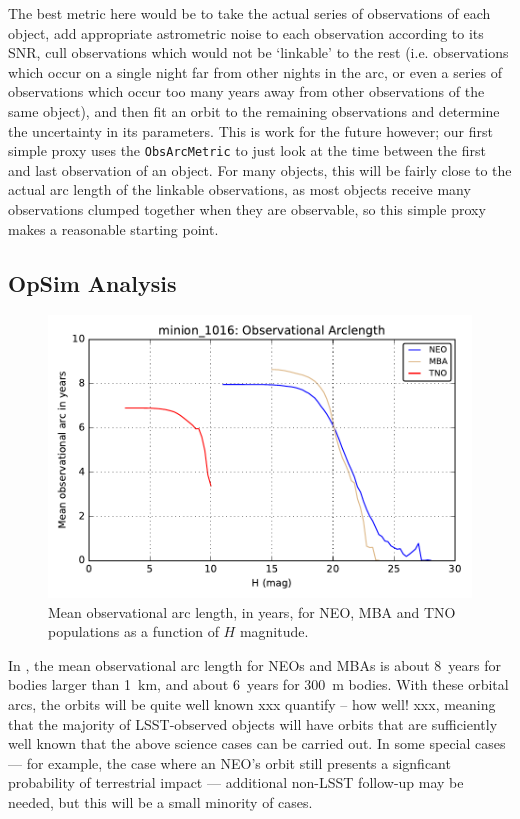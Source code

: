 The best metric here would be to take the actual series of
observations of each object, add appropriate astrometric noise to each
observation according to its SNR, cull observations which would not be
`linkable' to the rest (i.e. observations which occur on a single
night far from other nights in the arc, or even a series of observations which occur
too many years away from other observations of the same object), and
then fit an orbit to the remaining observations and determine the
uncertainty in its parameters. This is work for the future however;
our first simple proxy uses the {\tt ObsArcMetric} to just look at the time between the first and
last observation of an object. For many objects, this will be
fairly close to the actual arc length of the linkable observations, as most
objects receive many observations clumped together when they are
observable, so this simple proxy makes a reasonable starting point.



\subsection{OpSim Analysis}
\label{sec:\secname:analysis}

\begin{figure}
\includegraphics[width=6in]{figs/solarsystem/minion_1016_ObsArc_neo_tno_mba_MOOB_ComboMetricVsH}
\caption{Mean observational arc length, in years, for NEO, MBA and TNO
  populations as a function of $H$ magnitude.
\label{obsarc}}
\end{figure}

In , the mean observational arc length for
NEOs and MBAs is about 8~years for bodies larger than 1~km, and about 
6~years for 300~m bodies. With these
orbital arcs, the orbits will be quite well known
xxx quantify -- how well! xxx, meaning that the majority
of LSST-observed objects will have orbits that are sufficiently
well known that the above science cases can be carried out.
In some special cases --- for example, the case where 
an NEO's orbit still presents a signficant probability 
of terrestrial impact --- additional non-LSST follow-up
may be needed, but this will be a small minority of cases.

